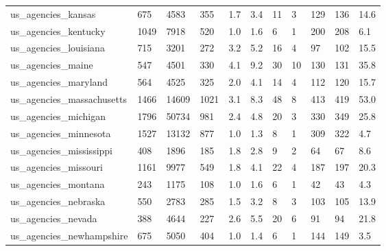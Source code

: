 \begin{longtable}{lllllllllll}
 us\_agencies\_kansas                                 & 675        & 4583      & 355   & 1.7    & 3.4    & 11    & 3      & 129    & 136    & 14.6    \\
 us\_agencies\_kentucky                               & 1049       & 7918      & 520   & 1.0    & 1.6    & 6     & 1      & 200    & 208    & 6.1     \\
 us\_agencies\_louisiana                              & 715        & 3201      & 272   & 3.2    & 5.2    & 16    & 4      & 97     & 102    & 15.5    \\
 us\_agencies\_maine                                  & 547        & 4501      & 330   & 4.1    & 9.2    & 30    & 10     & 130    & 131    & 35.8    \\
 us\_agencies\_maryland                               & 564        & 4525      & 325   & 2.0    & 4.1    & 14    & 4      & 112    & 120    & 15.7    \\
 us\_agencies\_massachusetts                          & 1466       & 14609     & 1021  & 3.1    & 8.3    & 48    & 8      & 413    & 419    & 53.0    \\
 us\_agencies\_michigan                               & 1796       & 50734     & 981   & 2.4    & 4.8    & 20    & 3      & 330    & 349    & 25.8    \\
 us\_agencies\_minnesota                              & 1527       & 13132     & 877   & 1.0    & 1.3    & 8     & 1      & 309    & 322    & 4.7     \\
 us\_agencies\_mississippi                            & 408        & 1896      & 185   & 1.8    & 2.8    & 9     & 2      & 64     & 67     & 8.6     \\
 us\_agencies\_missouri                               & 1161       & 9977      & 549   & 1.8    & 4.1    & 22    & 4      & 187    & 197    & 20.3    \\
 us\_agencies\_montana                                & 243        & 1175      & 108   & 1.0    & 1.6    & 6     & 1      & 42     & 43     & 4.3     \\
 us\_agencies\_nebraska                               & 550        & 2783      & 285   & 1.5    & 3.2    & 8     & 3      & 103    & 105    & 13.9    \\
 us\_agencies\_nevada                                 & 388        & 4644      & 227   & 2.6    & 5.5    & 20    & 6      & 91     & 94     & 21.8    \\
 us\_agencies\_newhampshire                           & 675        & 5050      & 404   & 1.0    & 1.4    & 6     & 1      & 144    & 149    & 3.5     \\

\end{longtable}
